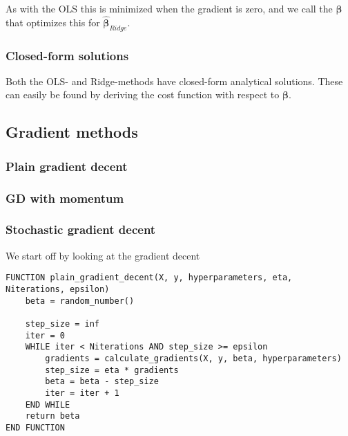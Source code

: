 As with the OLS this is minimized when the gradient is zero, and we call the $\boldsymbol\beta$ that optimizes this for $\hat{\boldsymbol\beta}_{Ridge}$. 

\subsubsection{Closed-form solutions}
Both the OLS- and Ridge-methods have closed-form analytical solutions. These can easily be found by deriving the cost function with respect to $\boldsymbol{\beta}$. 
\subsection{Gradient methods}
\subsubsection{Plain gradient decent}

\subsubsection{GD with momentum}

\subsubsection{Stochastic gradient decent}






We start off by looking at the gradient decent

\begin{lstlisting}
FUNCTION plain_gradient_decent(X, y, hyperparameters, eta, Niterations, epsilon)
	beta = random_number()

	step_size = inf
	iter = 0
	WHILE iter < Niterations AND step_size >= epsilon
		gradients = calculate_gradients(X, y, beta, hyperparameters)
		step_size = eta * gradients
		beta = beta - step_size
		iter = iter + 1
	END WHILE
	return beta
END FUNCTION
\end{lstlisting}





